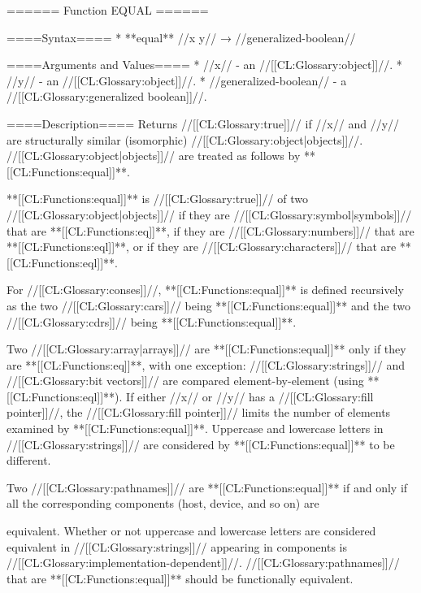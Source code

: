 ====== Function EQUAL ======

====Syntax====
  * **equal** //x y// → //generalized-boolean//

====Arguments and Values====
  * //x// - an //[[CL:Glossary:object]]//.
  * //y// - an //[[CL:Glossary:object]]//.
  * //generalized-boolean// - a //[[CL:Glossary:generalized boolean]]//.

====Description====
Returns //[[CL:Glossary:true]]// if //x// and //y// are structurally similar (isomorphic) //[[CL:Glossary:object|objects]]//. //[[CL:Glossary:object|objects]]// are treated as follows by **[[CL:Functions:equal]]**.

\beginlist {}

**[[CL:Functions:equal]]** is //[[CL:Glossary:true]]// of two //[[CL:Glossary:object|objects]]// if they are //[[CL:Glossary:symbol|symbols]]// that are **[[CL:Functions:eq]]**, if they are //[[CL:Glossary:numbers]]// that are **[[CL:Functions:eql]]**, or if they are //[[CL:Glossary:characters]]// that are **[[CL:Functions:eql]]**.


For //[[CL:Glossary:conses]]//, **[[CL:Functions:equal]]** is defined recursively as the two //[[CL:Glossary:cars]]// being **[[CL:Functions:equal]]** and the two //[[CL:Glossary:cdrs]]// being **[[CL:Functions:equal]]**.


Two //[[CL:Glossary:array|arrays]]// are **[[CL:Functions:equal]]** only if they are **[[CL:Functions:eq]]**, with one exception: //[[CL:Glossary:strings]]// and //[[CL:Glossary:bit vectors]]// are compared element-by-element (using **[[CL:Functions:eql]]**). If either //x// or //y// has a //[[CL:Glossary:fill pointer]]//, the //[[CL:Glossary:fill pointer]]// limits the number of elements examined by **[[CL:Functions:equal]]**. Uppercase and lowercase letters in //[[CL:Glossary:strings]]// are considered by **[[CL:Functions:equal]]** to be different.


Two //[[CL:Glossary:pathnames]]// are **[[CL:Functions:equal]]** if and only if all the corresponding components (host, device, and so on) are

equivalent. Whether or not uppercase and lowercase letters are considered equivalent in //[[CL:Glossary:strings]]// appearing in components is //[[CL:Glossary:implementation-dependent]]//. //[[CL:Glossary:pathnames]]// that are **[[CL:Functions:equal]]** should be functionally equivalent.

